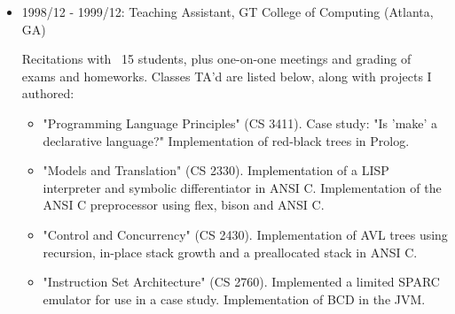 \documentclass{article}
\newenvironment{tightitemize}
{\begin{itemize}
  \setlength{\itemsep}{1pt}
  \setlength{\parskip}{0pt}
  \setlength{\parsep}{0pt}}
{\end{itemize}}
\begin{document}
\begin{tightitemize}
\begin{tightitemize}
\item Led research team, focused on intrusion prevention, parallelized and
  distributed intrusion detection, and multiple pattern matching. Implemented
  several techniques later published by academia. Led interviewing.
\item Sole developer of code for the Reflex Interceptor (now Reflex IPS(TM) and
  Reflex MG(TM)), a Layer-2 bridging NIPS running Linux. This included:
    \item tako, an IPS application statefully analyzing multiple GigE links inline
      and in real time, performing a forwarding verdict on each frame via use
      of mmap(2)ed packet sockets + custom netlink(7linux) messages,
    \item geso, an SMTP proxy making use of a Kaspersky Anti-Virus backend to
      filter mail inline and in real time, designed to be trivially extended
      to other store-and-forward protocols,
    \item build systems, automated testing and benchmarking tools, and backend
      platform configuration management for these applications, and
    \item kernel patches to change driver mechanics, expand the netlink socket
      infrastructure, and provide an interface into mmap(2)-backed sockets.
\item PCT/US2004/023739. Sys+Method for Threat Detection and Response. 2005-02-03.
\end{tightitemize}

\item 1998/12 - 1999/12: Teaching Assistant, GT College of Computing (Atlanta, GA)

Recitations with ~15 students, plus one-on-one meetings and grading of exams
and homeworks. Classes TA'd are listed below, along with projects I authored:

\begin{tightitemize}
\item "Programming Language Principles" (CS 3411). Case study: "Is 'make' a
   declarative language?" Implementation of red-black trees in Prolog.
\item "Models and Translation" (CS 2330). Implementation of a LISP interpreter
   and symbolic differentiator in ANSI C. Implementation of the ANSI C
   preprocessor using flex, bison and ANSI C.
\item "Control and Concurrency" (CS 2430). Implementation of AVL trees using
   recursion, in-place stack growth and a preallocated stack in ANSI C.
\item "Instruction Set Architecture" (CS 2760). Implemented a limited SPARC
   emulator for use in a case study. Implementation of BCD in the JVM.
\end{tightitemize}


\end{tightitemize}
\end{document}
